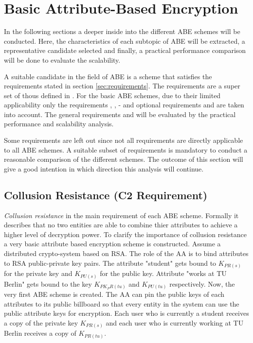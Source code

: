 \section{Basic Attribute-Based Encryption}
In the following sections a deeper inside into the different ABE schemes will be conducted. Here, the characteristics of each subtopic of ABE  will be extracted, a representative candidate selected and finally, a practical performance comparison will be done to evaluate the scalability. 

A suitable candidate in the field of ABE is a scheme that satisfies the requirements stated in section \ref{sec:requirements}. The requirements are a super set of thous defined in \cite{lee2013survey}. For the basic \ac{ABE} schemes, due to their limited applicability only the requirements , ,  -  and optional requirements  and  are taken into account.
The general requirements  and  will be evaluated by the practical performance and scalability analysis. 

Some requirements are left out since not all requirements are directly applicable to all ABE schemes. A suitable subset of requirements is mandatory to conduct a reasonable comparison of the different schemes. The outcome of this section will give a good intention in which direction this analysis will continue. 

\subsection{Collusion Resistance (C2 Requirement)}
\textit{Collusion resistance} in the main requirement of each ABE scheme. Formally it describes that no two entities are able to combine thier attributes to achieve a higher level of decryption power. To clarify the importance of collusion resistance a very basic attribute based encryption scheme is constructed. Assume a distributed crypto-system based on \ac{RSA}. The role of the \ac{AA} is to bind attributes to \ac{RSA} public-private key pairs. The attribute "student" gets bound to $K_{PR(s)}$ for the private key and $K_{PU(s)}$ for the public key. Attribute "works at TU Berlin" gets bound to the key $K_{PK_PR(tu)}$ and $K_{PU(tu)}$ respectively. Now, the very first ABE scheme is created. The AA can pin the public keys of each attributes to its public billboard so that every entity in the system can use the public attribute keys for encryption. Each user who is currently a student receives a copy of the private key $K_{PR(s)}$ and each user who is currently working at TU Berlin receives a copy of $K_{PR(tu)}$. 

